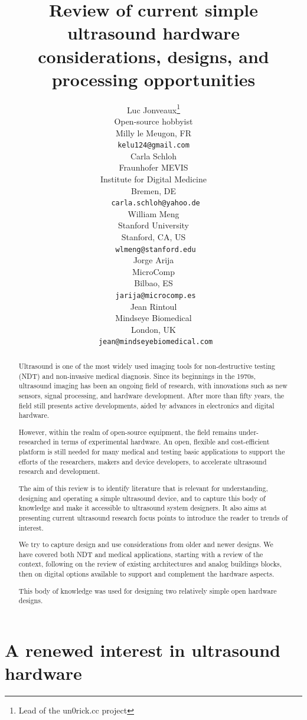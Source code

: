 \documentclass{article}
\title{Review of current simple ultrasound hardware considerations, designs, and processing opportunities}
\author{
 Luc Jonveaux\thanks{Lead of the un0rick.cc project } \\
 Open-source hobbyist \\
 Milly le Meugon, FR\\
 \texttt{kelu124@gmail.com} \\
 \And
 Carla Schloh \\
 Fraunhofer MEVIS\\
 Institute for Digital Medicine\\
 Bremen, DE\\
 \texttt{ carla.schloh@yahoo.de} \\
\And
 William Meng \\
Stanford University \\
 Stanford, CA, US\\
 \texttt{ wlmeng@stanford.edu} \\
 \And
 Jorge Arija \\
MicroComp \\
 Bilbao, ES\\
 \texttt{ jarija@microcomp.es} \\
   \And
 Jean Rintoul \\
Mindseye Biomedical \\
 London, UK\\
 \texttt{ jean@mindseyebiomedical.com} \\
 }
\begin{document}
\maketitle

\begin{abstract}

Ultrasound is one of the most widely used imaging tools for non-destructive testing (NDT) and non-invasive medical diagnosis.
Since its beginnings in the 1970s, ultrasound imaging has been an ongoing field of research,
with innovations such as new sensors, signal processing, and hardware development. After more than fifty years, the field still presents active developments, aided by advances in electronics and digital hardware.

However, within the realm of open-source equipment, the field remains under-researched in terms of experimental hardware. An open, flexible and cost-efficient platform is still needed for many medical and testing basic applications to support the efforts of the researchers, makers and device developers, to accelerate ultrasound research and development.

The aim of this review is to identify literature that is relevant for understanding, designing and operating a simple ultrasound device, and to capture this body of knowledge and make it accessible to ultrasound system designers. It also aims at presenting current ultrasound research focus points to introduce the reader to trends of interest.

We try to capture design and use considerations from older and newer designs. We have covered both NDT and medical applications, starting with a review of the context, following on the review of existing architectures and analog buildings blocks, then on digital options available to support and complement the hardware aspects.

This body of knowledge was used for designing two relatively simple open hardware designs.



\end{abstract}




\newpage


\section{A renewed interest in ultrasound hardware}
\end{document}
